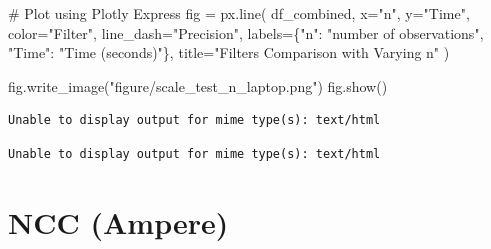 \documentclass[
]{report}
\newenvironment{Shaded}{\begin{snugshade}}{\end{snugshade}}
\newcommand{\CommentTok}[1]{\textcolor[rgb]{0.37,0.37,0.37}{#1}}
\newcommand{\NormalTok}[1]{\textcolor[rgb]{0.00,0.23,0.31}{#1}}
\newcommand{\OperatorTok}[1]{\textcolor[rgb]{0.37,0.37,0.37}{#1}}
\newcommand{\StringTok}[1]{\textcolor[rgb]{0.13,0.47,0.30}{#1}}
\begin{document}
\begin{Shaded}
\begin{Highlighting}[]
\CommentTok{\# Plot using Plotly Express}
\NormalTok{fig }\OperatorTok{=}\NormalTok{ px.line(}
\NormalTok{    df\_combined,}
\NormalTok{    x}\OperatorTok{=}\StringTok{"n"}\NormalTok{,}
\NormalTok{    y}\OperatorTok{=}\StringTok{"Time"}\NormalTok{,}
\NormalTok{    color}\OperatorTok{=}\StringTok{"Filter"}\NormalTok{,}
\NormalTok{    line\_dash}\OperatorTok{=}\StringTok{"Precision"}\NormalTok{,}
\NormalTok{    labels}\OperatorTok{=}\NormalTok{\{}\StringTok{"n"}\NormalTok{: }\StringTok{"number of observations"}\NormalTok{, }\StringTok{"Time"}\NormalTok{: }\StringTok{"Time (seconds)"}\NormalTok{\},}
\NormalTok{    title}\OperatorTok{=}\StringTok{"Filters Comparison with Varying n"}
\NormalTok{)}

\NormalTok{fig.write\_image(}\StringTok{"figure/scale\_test\_n\_laptop.png"}\NormalTok{)}
\NormalTok{fig.show()}
\end{Highlighting}
\end{Shaded}

\begin{verbatim}
Unable to display output for mime type(s): text/html
\end{verbatim}

\begin{verbatim}
Unable to display output for mime type(s): text/html
\end{verbatim}

\chapter{NCC (Ampere)}\label{ncc-ampere}
\end{document}
